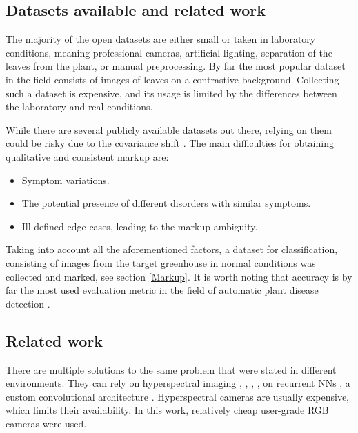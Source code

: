 \begin{description}
\subsection{Datasets available and related work}

The majority of the open datasets are either small or taken in laboratory conditions, meaning professional cameras, artificial lighting, separation of the leaves from the plant, or manual preprocessing.
By far the most popular dataset in the field \cite{hughes2015open} consists of images of leaves on a contrastive background.
Collecting such a dataset is expensive, and its usage is limited by the differences between the laboratory and real conditions.

While there are several publicly available datasets out there, relying on them could be risky due to the covariance shift \cite{sugiyama2008direct}.
The main difficulties for obtaining qualitative and consistent markup are\cite{barbedo2016review}:
\begin{itemize}
    \item Symptom variations.
    \item The potential presence of different disorders with similar symptoms.
    \item Ill-defined edge cases, leading to the markup ambiguity.
\end{itemize}Taking into account all the aforementioned factors, a dataset for classification, consisting of images from the target greenhouse in normal conditions was collected and marked, see section \ref{Markup}.
It is worth noting that accuracy is by far the most used evaluation metric in the field of automatic plant disease detection \cite{teeffelen2023detection}.


\subsection{Related work}

There are multiple solutions to the same problem that were stated in different environments.
They can rely on hyperspectral imaging \cite{zhang2023detection}, \cite{fernandez2021cucumber}, \cite{PowderyZiheng}, \cite{abdulridha2020detecting}, on recurrent NNs \cite{varshney2021deep}, a custom convolutional architecture \cite{lin2019deep}.
Hyperspectral cameras are usually expensive, which limits their availability.
In this work, relatively cheap user-grade RGB cameras were used.


\end{description}
